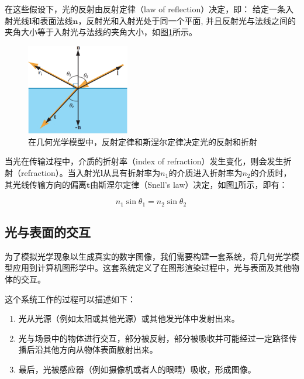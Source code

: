 在这些假设下，光的反射由反射定律（law of reflection）决定，即： 给定一条入射光线$\mathbf{l}$和表面法线$\mathbf{n}$，反射光和入射光处于同一个平面, 并且反射光与法线之间的夹角大小等于入射光与法线的夹角大小，如图\ref{f:intro-Ray-optics-model}所示。

\begin{figure}
\sidecaption
	\includegraphics[width=0.4\textwidth]{graphics/gi/ray-optics-1}
	\caption{在几何光学模型中，反射定律和斯涅尔定律决定光的反射和折射}
	\label{f:intro-Ray-optics-model}
\end{figure}

当光在传输过程中，介质的折射率（index of refraction）发生变化，则会发生折射（refraction）。当入射光$\mathbf{l}$从具有折射率为$n_1$的介质进入折射率为$n_2$的介质时， 其光线传输方向的偏离$\mathbf{t}$由斯涅尔定律（Snell's law）决定，如图\ref{f:intro-Ray-optics-model}所示，即有：

\begin{equation}\label{eq:intro-snell-Law}
	n_1\sin\theta_1 = n_2\sin\theta_2\ 	
\end{equation}





\subsection{光与表面的交互}
为了模拟光学现象以生成真实的数字图像，我们需要构建一套系统，将几何光学模型应用到计算机图形学中。这套系统定义了在图形渲染过程中，光与表面及其他物体的交互。

这个系统工作的过程可以描述如下：

\begin{enumerate}
	\item 光从光源（例如太阳或其他光源）或其他发光体中发射出来。
	\item 光与场景中的物体进行交互，部分被反射，部分被吸收并可能经过一定路径传播后沿其他方向从物体表面散射出来。
	\item 最后，光被感应器（例如摄像机或者人的眼睛）吸收，形成图像。
\end{enumerate}

